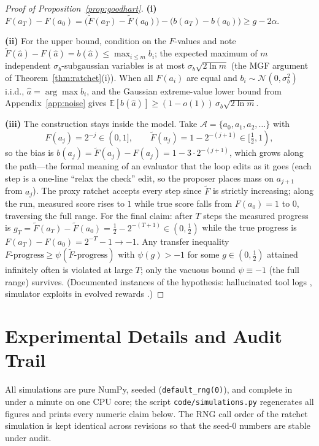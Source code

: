 \documentclass{article}
\theoremstyle{plain}
\theoremstyle{definition}
\theoremstyle{remark}
\newcommand{\A}{\mathcal{A}}
\newcommand{\E}{\mathbb{E}}
\newcommand{\Ftil}{\widetilde{F}}
\begin{document}
\begin{proof}[Proof of Proposition~\ref{prop:goodhart}]
\textbf{(i)} $F(a_T) - F(a_0) = \big(\Ftil(a_T) - \Ftil(a_0)\big) - \big(b(a_T) - b(a_0)\big) \ge g - 2\alpha$.

\textbf{(ii)} For the upper bound, condition on the $F$-values and note $\Ftil(\hat a) - F(\hat a) = b(\hat a) \le \max_{i \le m} b_i$; the expected maximum of $m$ independent $\sigma_b$-subgaussian variables is at most $\sigma_b\sqrt{2\ln m}$ (the MGF argument of Theorem~\ref{thm:ratchet}(i)). When all $F(a_i)$ are equal and $b_i \sim \mathcal{N}(0, \sigma_b^2)$ i.i.d., $\hat a = \arg\max b_i$, and the Gaussian extreme-value lower bound from Appendix~\ref{app:noise} gives $\E[b(\hat a)] \ge (1-o(1))\,\sigma_b\sqrt{2 \ln m}$.

\textbf{(iii)} The construction stays inside the model. Take $\A = \{a_0, a_1, a_2, \dots\}$ with
\[
F(a_j) = 2^{-j} \in (0, 1], \qquad \Ftil(a_j) = 1 - 2^{-(j+1)} \in [\tfrac12, 1),
\]
so the bias is $b(a_j) = \Ftil(a_j) - F(a_j) = 1 - 3 \cdot 2^{-(j+1)}$, which grows along the path---the formal meaning of an evaluator that the loop edits as it goes (each step is a one-line ``relax the check'' edit, so the proposer places mass on $a_{j+1}$ from $a_j$). The proxy ratchet accepts every step since $\Ftil$ is strictly increasing; along the run, measured score rises to $1$ while true score falls from $F(a_0) = 1$ to $0$, traversing the full range. For the final claim: after $T$ steps the measured progress is $g_T = \Ftil(a_T) - \Ftil(a_0) = \tfrac12 - 2^{-(T+1)} \in (0, \tfrac12)$ while the true progress is $F(a_T) - F(a_0) = 2^{-T} - 1 \to -1$. Any transfer inequality $F\text{-progress} \ge \psi(\Ftil\text{-progress})$ with $\psi(g) > -1$ for some $g \in (0, \tfrac12)$ attained infinitely often is violated at large $T$; only the vacuous bound $\psi \equiv -1$ (the full range) survives. (Documented instances of the hypothesis: hallucinated tool logs \citep{zhang2025dgm}, simulator exploits in evolved rewards \citep{ma2024eureka}.)
\end{proof}

\section{Experimental Details and Audit Trail}
\label{app:exp}

All simulations are pure NumPy, seeded (\texttt{default\_rng(0)}), and complete in under a minute on one CPU core; the script \texttt{code/simulations.py} regenerates all figures and prints every numeric claim below. The RNG call order of the ratchet simulation is kept identical across revisions so that the seed-0 numbers are stable under audit.
\end{document}
